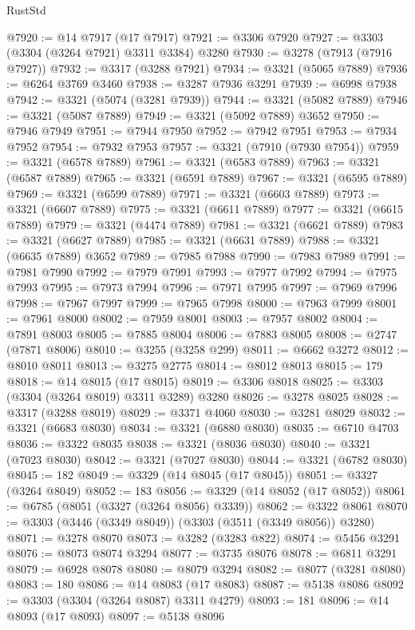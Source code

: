 \begin{lexlean}{RustStd}
\begin{coremodule}
@7920 := @14 @7917 (@17 @7917)
@7921 := @3306 @7920
@7927 := @3303 (@3304 (@3264 @7921) @3311 @3384) @3280
@7930 := @3278 (@7913 (@7916 @7927))
@7932 := @3317 (@3288 @7921)
@7934 := @3321 (@5065 @7889)
@7936 := @6264 @3769 @3460
@7938 := @3287 @7936 @3291
@7939 := @6998 @7938
@7942 := @3321 (@5074 (@3281 @7939))
@7944 := @3321 (@5082 @7889)
@7946 := @3321 (@5087 @7889)
@7949 := @3321 (@5092 @7889) @3652
@7950 := @7946 @7949
@7951 := @7944 @7950
@7952 := @7942 @7951
@7953 := @7934 @7952
@7954 := @7932 @7953
@7957 := @3321 (@7910 (@7930 @7954))
@7959 := @3321 (@6578 @7889)
@7961 := @3321 (@6583 @7889)
@7963 := @3321 (@6587 @7889)
@7965 := @3321 (@6591 @7889)
@7967 := @3321 (@6595 @7889)
@7969 := @3321 (@6599 @7889)
@7971 := @3321 (@6603 @7889)
@7973 := @3321 (@6607 @7889)
@7975 := @3321 (@6611 @7889)
@7977 := @3321 (@6615 @7889)
@7979 := @3321 (@4474 @7889)
@7981 := @3321 (@6621 @7889)
@7983 := @3321 (@6627 @7889)
@7985 := @3321 (@6631 @7889)
@7988 := @3321 (@6635 @7889) @3652
@7989 := @7985 @7988
@7990 := @7983 @7989
@7991 := @7981 @7990
@7992 := @7979 @7991
@7993 := @7977 @7992
@7994 := @7975 @7993
@7995 := @7973 @7994
@7996 := @7971 @7995
@7997 := @7969 @7996
@7998 := @7967 @7997
@7999 := @7965 @7998
@8000 := @7963 @7999
@8001 := @7961 @8000
@8002 := @7959 @8001
@8003 := @7957 @8002
@8004 := @7891 @8003
@8005 := @7885 @8004
@8006 := @7883 @8005
@8008 := @2747 (@7871 @8006)
@8010 := @3255 (@3258 @299)
@8011 := @6662 @3272
@8012 := @8010 @8011
@8013 := @3275 @2775
@8014 := @8012 @8013
@8015 := 179
@8018 := @14 @8015 (@17 @8015)
@8019 := @3306 @8018
@8025 := @3303 (@3304 (@3264 @8019) @3311 @3289) @3280
@8026 := @3278 @8025
@8028 := @3317 (@3288 @8019)
@8029 := @3371 @4060
@8030 := @3281 @8029
@8032 := @3321 (@6683 @8030)
@8034 := @3321 (@6880 @8030)
@8035 := @6710 @4703
@8036 := @3322 @8035
@8038 := @3321 (@8036 @8030)
@8040 := @3321 (@7023 @8030)
@8042 := @3321 (@7027 @8030)
@8044 := @3321 (@6782 @8030)
@8045 := 182
@8049 := @3329 (@14 @8045 (@17 @8045))
@8051 := @3327 (@3264 @8049)
@8052 := 183
@8056 := @3329 (@14 @8052 (@17 @8052))
@8061 := @6785 (@8051 (@3327 (@3264 @8056) @3339))
@8062 := @3322 @8061
@8070 := @3303 (@3446 (@3349 @8049)) (@3303 (@3511 (@3349 @8056)) @3280)
@8071 := @3278 @8070
@8073 := @3282 (@3283 @822)
@8074 := @5456 @3291
@8076 := @8073 @8074 @3294
@8077 := @3735 @8076
@8078 := @6811 @3291
@8079 := @6928 @8078
@8080 := @8079 @3294
@8082 := @8077 (@3281 @8080)
@8083 := 180
@8086 := @14 @8083 (@17 @8083)
@8087 := @5138 @8086
@8092 := @3303 (@3304 (@3264 @8087) @3311 @4279)
@8093 := 181
@8096 := @14 @8093 (@17 @8093)
@8097 := @5138 @8096

\end{coremodule}
\end{lexlean}
